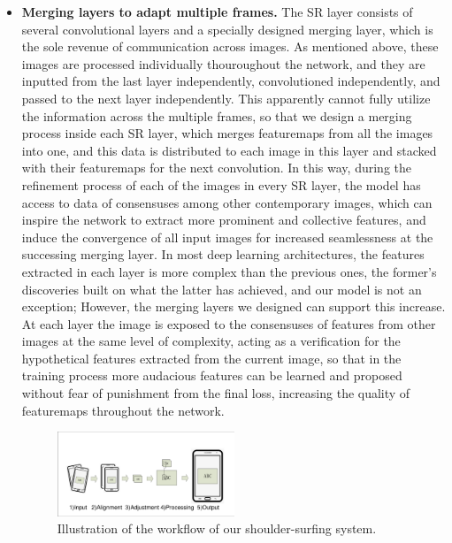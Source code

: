 \begin{itemize}[leftmargin=*]
  \item \textbf{Merging layers to adapt multiple frames.} The SR layer consists of several convolutional layers and a specially designed merging layer, which is the sole revenue of communication across images. As mentioned above, these images are processed individually thouroughout the network, and they are inputted from the last layer independently, convolutioned independently, and passed to the next layer independently. This apparently cannot fully utilize the information across the multiple frames, so that we design a merging process inside each SR layer, which merges featuremaps from all the images into one, and this data is distributed to each image in this layer and stacked with their featuremaps for the next convolution. In this way, during the refinement process of each of the images in every SR layer, the model has access to data of consensuses among other contemporary images, which can inspire the network to extract more prominent and collective features, and induce the convergence of all input images for increased seamlessness at the successing merging layer. In most deep learning architectures, the features extracted in each layer is more complex than the previous ones, the former's discoveries built on what the latter has achieved, and our model is not an exception; However, the merging layers we designed can support this increase. At each layer the image is exposed to the consensuses of features from other images at the same level of complexity, acting as a verification for the hypothetical features extracted from the current image, so that in the training process more audacious features can be learned and proposed without fear of punishment from the final loss, increasing the quality of featuremaps throughout the network.
  \begin{figure}
    \centering
       \includegraphics[width=0.5\textwidth]{./pic/workflow.pdf}
       \caption{Illustration of the workflow of our shoulder-surfing system.}
       \label{fig-workflow}
  \end{figure}

\end{itemize}
